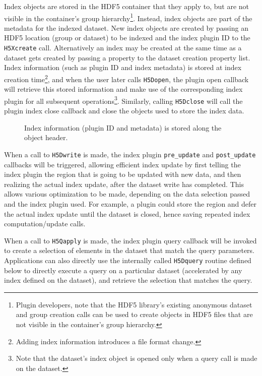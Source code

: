 Index objects are stored in the HDF5 container that they apply to, but are not
visible in the container's group hierarchy\footnote{Plugin developers, note that
the HDF5 library's existing anonymous dataset and group creation calls can be
used to create objects in HDF5 files that are not visible in the container's
group hierarchy.}.
Instead, index objects are part of the metadata for the indexed dataset. New index
objects are created by passing an HDF5 location (group or dataset) to be indexed
and the index plugin ID to the \texttt{H5Xcreate} call.
Alternatively an index may be created at the same time as a dataset gets created
by passing a property to the dataset creation property list.
Index information (such as plugin ID and index metadata) is stored at index
creation time\footnote{Adding index information introduces a file format change.},
and when the user later calls \texttt{H5Dopen}, the plugin open
callback will retrieve this stored information and make use of the corresponding
index plugin for all subsequent operations\footnote{Note that the dataset's
index object is opened only when a query call is made on the dataset.}.
Similarly, calling \texttt{H5Dclose}
will call the plugin index close callback and close the objects used to store
the index data.

\begin{figure}
\vspace{-30pt}

\caption{Index information (plugin ID and metadata) is stored along the object header.}
\label{fig:hdf5_index}
\vspace{-20pt}
\end{figure}

When a call to \texttt{H5Dwrite} is made, the index plugin \texttt{pre\_update} and
\texttt{post\_update} callbacks will be triggered, allowing efficient index
update by first telling the index plugin the region that is going to be updated
with new data, and then realizing the actual index update, after the dataset
write has completed. This allows various optimization to be made, depending on
the data selection passed and the index plugin used. For example, a plugin could
store the region and defer the actual index update until the dataset is closed,
hence saving repeated index computation/update calls.

When a call to \texttt{H5Qapply} is made, the index plugin query callback will be
invoked to create a selection of elements in the dataset that match the query
parameters. Applications can also directly use the internally called
\texttt{H5Dquery} routine defined below to directly execute a query on a
particular dataset (accelerated by any index defined on the dataset),
and retrieve the selection that matches the query.

